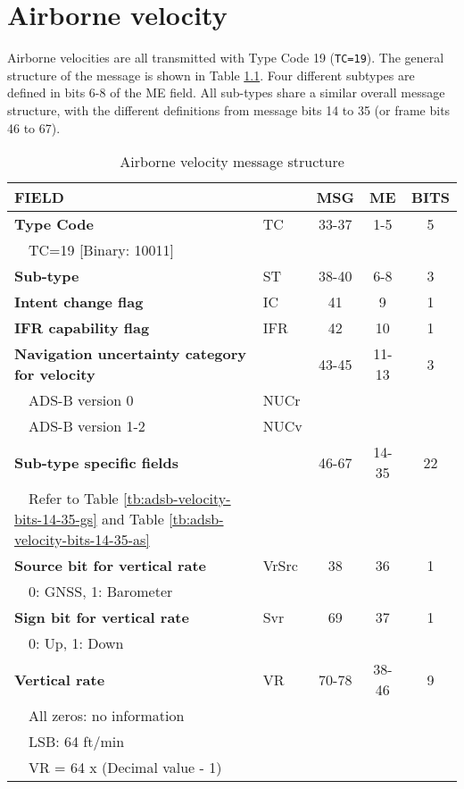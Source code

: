\chapter{Airborne velocity}

Airborne velocities are all transmitted with Type Code 19 (\texttt{TC=19}). The general structure of the message is shown in Table \ref{tb:adsb-velocity-bits}. Four different subtypes are defined in bits 6-8 of the ME field. All sub-types share a similar overall message structure, with the different definitions from message bits 14 to 35 (or frame bits 46 to 67). 

\begin{table}[ht]
\caption{Airborne velocity message structure}
\label{tb:adsb-velocity-bits}
\footnotesize
\begin{tabular}{|l|l|c|c|c|}
\hline
\textbf{FIELD} & & \textbf{MSG} & \textbf{ME} & \textbf{BITS} \\ \hline
\hline
\textbf{Type Code} & TC & 33-37 & 1-5 & 5\\
~~TC=19 {[}Binary: 10011{]} &&&& \\ \hline
\textbf{Sub-type} & ST & 38-40 & 6-8 & 3\\
\hline
\textbf{Intent change flag} & IC & 41 & 9 & 1 \\ \hline
\textbf{IFR capability flag} & IFR & 42 & 10 & 1 \\ \hline
\textbf{Navigation uncertainty category for velocity} & & 43-45 & 11-13 & 3\\
~~ADS-B version 0 & NUCr &&&\\
~~ADS-B version 1-2 & NUCv &&&\\ \hline
\hline
\textbf{Sub-type specific fields} & & 46-67 & 14-35 & 22\\
~~Refer to Table \ref{tb:adsb-velocity-bits-14-35-gs} and Table \ref{tb:adsb-velocity-bits-14-35-as} &&&& \\ \hline
\hline
\textbf{Source bit for vertical rate} & VrSrc & 38 & 36 & 1 \\
~~0: GNSS, 1: Barometer &&&&\\ \hline
\textbf{Sign bit for vertical rate}  & Svr & 69 & 37 & 1 \\
~~0: Up, 1: Down &&&& \\ \hline
\textbf{Vertical rate} & VR & 70-78 & 38-46 & 9\\
~~All zeros: no information &&&&\\
~~LSB: 64 ft/min &&&&\\
~~VR = 64 x (Decimal value - 1) &&&& \\ \hline

\end{tabular}
\end{table}
